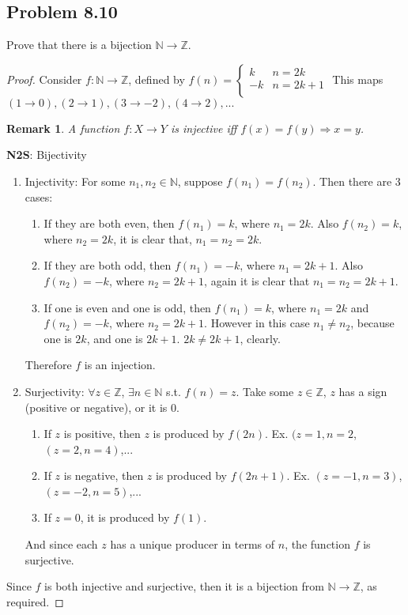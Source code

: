 \documentclass[12pt]{article}
\newtheorem*{remark}{Remark}
\newcommand{\N}{\mathbb{N}}
\newcommand{\Z}{\mathbb{Z}}
\begin{document}
\subsection{Problem 8.10}
Prove that there is a bijection $\N\to\Z$.
\begin{proof}
Consider $f:\N\to\Z$, defined by $f(n)=
\left\{
\begin{array}{ll}
      k & n=2k\\
      -k & n=2k+1\\
\end{array}\right.$
\newline This maps $(1\to0),(2\to1),(3\to-2),(4\to2),...$
\begin{remark}
A function $f:X\to Y$ is injective iff $f(x)=f(y)\Longrightarrow x=y$.
\end{remark}
\newline \textbf{N2S}: Bijectivity \begin{enumerate}
    \item Injectivity: For some $n_1,n_2\in\N$, suppose $f(n_1)=f(n_2)$. Then there are 3 cases:
    \begin{enumerate}
        \item If they are both even, then $f(n_1)=k$, where $n_1=2k$. Also $f(n_2)=k$, where $n_2=2k$, it is clear that, $n_1=n_2=2k$.
        \item If they are both odd, then $f(n_1)=-k$, where $n_1=2k+1$. Also $f(n_2)=-k$, where $n_2=2k+1$, again it is clear that $n_1=n_2=2k+1$.
        \item If one is even and one is odd, then $f(n_1)=k$, where $n_1=2k$ and $f(n_2)=-k$, where $n_2=2k+1$. However in this case $n_1\neq n_2$, because one is $2k$, and one is $2k+1$. $2k\neq2k+1$, clearly. \scalebox{1.5}{\Lightning}
    \end{enumerate}
    \newline Therefore $f$ is an injection.
    \item Surjectivity: $\forall z\in\Z$, $\exists n\in\N$ s.t. $f(n)=z$. Take some $z\in\Z$, $z$ has a sign (positive or negative), or it is 0. \begin{enumerate}
        \item If $z$ is positive, then $z$ is produced by $f(2n)$. Ex. $(z=1,n=2$, $(z=2,n=4)$,...
        \item If $z$ is negative, then $z$ is produced by $f(2n+1)$. Ex. $(z=-1,n=3)$, $(z=-2,n=5)$,...
        \item If $z=0$, it is produced by $f(1)$.
    \end{enumerate}
    And since each $z$ has a unique producer in terms of $n$, the function $f$ is surjective.
\end{enumerate}
Since $f$ is both injective and surjective, then it is a bijection from $\N\to\Z$, as required.
\end{proof}
\end{document}
